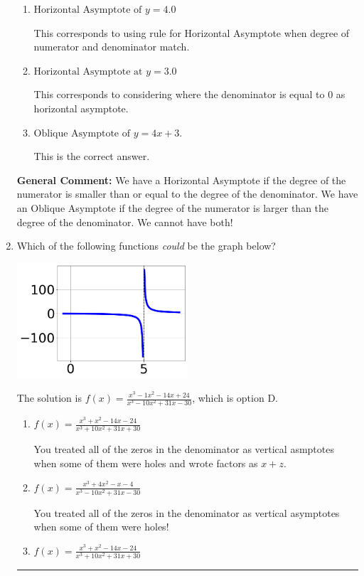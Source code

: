 \documentclass{extbook}[14pt]
\newcommand{\litem}[1]{\item #1

\rule{\textwidth}{0.4pt}}
\begin{document}
\begin{enumerate}
{\begin{enumerate}[label=\Alph*.]
This corresponds to believing there can be both a horizontal and oblique asymptote.
\item \( \text{Horizontal Asymptote of } y = 4.0  \)

This corresponds to using rule for Horizontal Asymptote when degree of numerator and denominator match.
\item \( \text{Horizontal Asymptote at } y = 3.0 \)

This corresponds to considering where the denominator is equal to 0 as horizontal asymptote.
\item \( \text{Oblique Asymptote of } y = 4x + 3. \)

This is the correct answer.
\end{enumerate}

\textbf{General Comment:} We have a Horizontal Asymptote if the degree of the numerator is smaller than or equal to the degree of the denominator. We have an Oblique Asymptote if the degree of the numerator is larger than the degree of the denominator. We cannot have both!
}
\litem{
Which of the following functions \textit{could} be the graph below?

\begin{center}
    \includegraphics[width=0.5\textwidth]{../Figures/identifyGraphOfRationalFunctionC.png}
\end{center}




The solution is \( f(x)=\frac{x^{3} -1 x^{2} -14 x + 24}{x^{3} -10 x^{2} +31 x -30} \), which is option D.\begin{enumerate}[label=\Alph*.]
\item \( f(x)=\frac{x^{3} + x^{2} -14 x -24}{x^{3} +10 x^{2} +31 x + 30} \)

You treated all of the zeros in the denominator as vertical asmptotes when some of them were holes and wrote factors as $x+z$.
\item \( f(x)=\frac{x^{3} +4 x^{2} -x -4}{x^{3} -10 x^{2} +31 x -30} \)

You treated all of the zeros in the denominator as vertical asymptotes when some of them were holes!
\item \( f(x)=\frac{x^{3} + x^{2} -14 x -24}{x^{3} +10 x^{2} +31 x + 30} \)


\end{enumerate}}
\end{enumerate}
\end{document}
